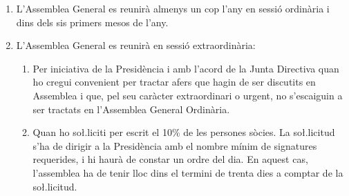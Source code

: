 \documentclass[11pt,a4paper]{article}
\newcommand{\JD}{Junta Directiva\xspace}
\newcommand{\AG}{Assemblea General\xspace}
\newcommand{\AGO}{Assemblea General Ordinària\xspace}
\begin{document}

\begin{enumerate}
    \item L'\AG es reunirà almenys un cop l'any en sessió ordinària i dins dels sis primers mesos de l'any.
    \item L'\AG es reunirà en sessió extraordinària:
    \begin{enumerate}
        \item Per iniciativa de la Presidència i amb l'acord de la \JD quan ho cregui convenient per tractar afers que hagin de ser discutits en Assemblea i que, pel seu caràcter extraordinari o urgent, no s'escaiguin a ser tractats en l'\AGO.
        \item Quan ho so\l.liciti per escrit el 10\% de les persones sòcies. La so\l.licitud s'ha de dirigir a la Presidència amb el nombre mínim de signatures requerides, i hi haurà de constar un ordre del dia. En aquest cas, l'assemblea ha de tenir lloc dins el termini de trenta dies a comptar de la so\l.licitud.
    \end{enumerate}
\end{enumerate}

\end{document}
